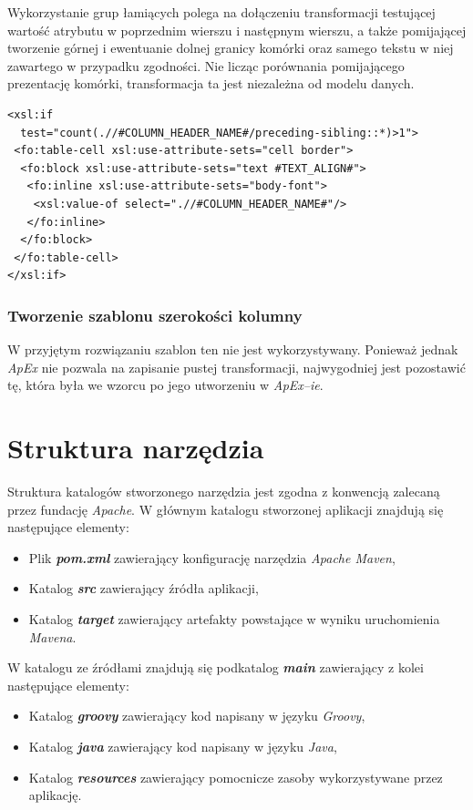 \documentclass[11pt,a4paper]{article}
\begin{document}
Wykorzystanie grup łamiących polega na dołączeniu transformacji testującej wartość atrybutu w poprzednim wierszu i następnym wierszu, a także pomijającej tworzenie górnej i ewentuanie dolnej granicy komórki oraz samego tekstu w niej zawartego w przypadku zgodności. Nie licząc porównania pomijającego prezentację komórki, transformacja ta jest niezależna od modelu danych. 

\lstset{language=XSLT}
\begin{lstlisting}[frame=single,caption=Transformacja dla komórki tabeli, label=cell:xslt]
<xsl:if 
  test="count(.//#COLUMN_HEADER_NAME#/preceding-sibling::*)>1">
 <fo:table-cell xsl:use-attribute-sets="cell border">
  <fo:block xsl:use-attribute-sets="text #TEXT_ALIGN#">
   <fo:inline xsl:use-attribute-sets="body-font">
    <xsl:value-of select=".//#COLUMN_HEADER_NAME#"/>
   </fo:inline>
  </fo:block>
 </fo:table-cell>
</xsl:if>
\end{lstlisting}


\subsubsection{Tworzenie szablonu szerokości kolumny}
W przyjętym rozwiązaniu szablon ten nie jest wykorzystywany. Ponieważ jednak \emph{ApEx} nie pozwala na zapisanie pustej transformacji, najwygodniej jest pozostawić tę, która była we wzorcu po jego utworzeniu w \emph{ApEx--ie}.
\newpage

\section{Struktura narzędzia}\label{solution:structure}
Struktura katalogów stworzonego narzędzia jest zgodna z konwencją zalecaną przez fundację \emph{Apache}. W głównym katalogu stworzonej aplikacji znajdują się następujące elementy:
\begin{itemize}
	\item Plik \emph{\textbf{pom.xml}} zawierający konfigurację narzędzia \emph{Apache Maven},
	\item Katalog \emph{\textbf{src}} zawierający źródła aplikacji,
	\item Katalog \emph{\textbf{target}} zawierający artefakty powstające w wyniku uruchomienia \emph{Mavena}. 
\end{itemize}


W katalogu ze źródłami znajdują się podkatalog \emph{\textbf{main}} zawierający z kolei następujące elementy:
\begin{itemize}
	\item Katalog \emph{\textbf{groovy}} zawierający kod napisany w języku \emph{Groovy},
	\item Katalog \emph{\textbf{java}} zawierający kod napisany w języku \emph{Java},
	\item Katalog \emph{\textbf{resources}} zawierający pomocnicze zasoby wykorzystywane przez aplikację.
\end{itemize}
\end{document}
